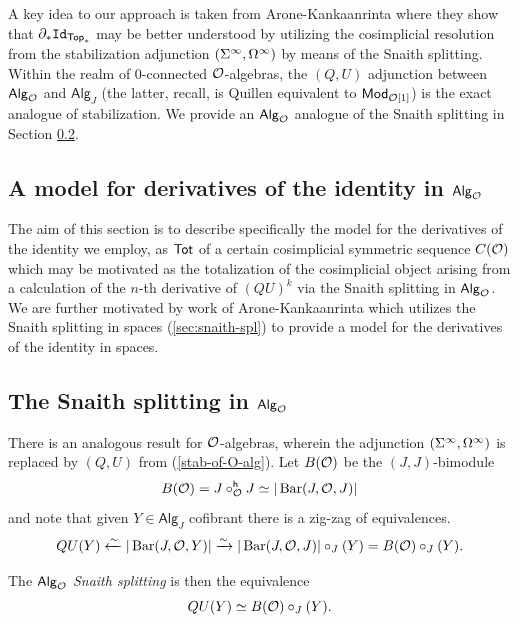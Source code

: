 A key idea to our approach is taken from Arone-Kankaanrinta \cite{AK} where they show that $\partial_* \mathtt{Id}_{\mathsf{Top}_*}$ may be better understood by utilizing the cosimplicial resolution from the stabilization adjunction $(\Sigma^{\infty},\Omega^{\infty})$ by means of the Snaith splitting. Within the realm of $0$-connected $\mathcal{O}$-algebras, the $(Q,U)$ adjunction between ${\mathsf{Alg}_{\mathcal{O}}}$ and $\mathsf{Alg}_J$ (the latter, recall, is Quillen equivalent to $\mathsf{Mod}_{\mathcal{O}[1]}$) is the exact analogue of stabilization. We provide an ${\mathsf{Alg}_{\mathcal{O}}}$ analogue of the Snaith splitting in Section \ref{sec:Snaith-O}.


\subsection{A model for derivatives of the identity in ${\mathsf{Alg}_{\mathcal{O}}}$}
The aim of this section is to describe specifically the model for the derivatives of the identity we employ, as $\operatorname{\mathsf{Tot}}$ of a certain cosimplicial symmetric sequence $C(\mathcal{O})$ which may be motivated as the totalization of the cosimplicial object arising from a calculation of the $n$-th derivative of $(QU)^k$ via the Snaith splitting in ${\mathsf{Alg}_{\mathcal{O}}}$. We are further motivated by work of Arone-Kankaanrinta \cite{AK} which utilizes the Snaith splitting in spaces (\ref{sec:snaith-spl}) to provide a model for the derivatives of the identity in spaces. 

\subsection{The Snaith splitting in ${\mathsf{Alg}_{\mathcal{O}}}$}
\label{sec:Snaith-O}There is an analogous result for $\mathcal{O}$-algebras, wherein the adjunction $(\Sigma^{\infty}, \Omega^{\infty})$ is replaced by $(Q, U)$ from (\ref{stab-of-O-alg}). Let $B(\mathcal{O})$ be the $(J,J)$-bimodule \[B(\mathcal{O})= J\circ^{\mathsf{h}}_{\mathcal{O}}J\simeq |\operatorname{Bar}(J,\mathcal{O},J)|\] and note that given $Y\in \mathsf{Alg}_J$ cofibrant there is a zig-zag of equivalences. 
\[ QU(Y) \xleftarrow{\sim} |\operatorname{Bar}(J, \mathcal{O}, Y)| \xrightarrow{\sim} |\operatorname{Bar}(J, \mathcal{O}, J)| \circ_J (Y)= B(\mathcal{O}) \circ_J (Y).\]

The \textit{${\mathsf{Alg}_{\mathcal{O}}}$ Snaith splitting} is then the equivalence \begin{equation} \label{eq:TQ-Snaith}
    Q U(Y)\simeq B(\mathcal{O}) \circ_J (Y).
\end{equation}

